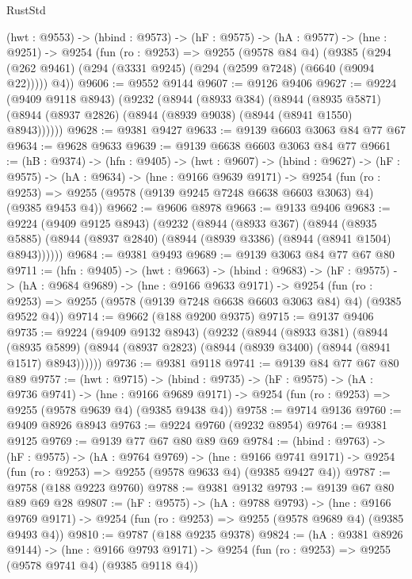 \begin{lexlean}{RustStd}
\begin{coremodule}
  (hwt : @9553) ->
  (hbind : @9573) ->
  (hF : @9575) ->
  (hA : @9577) ->
  (hne : @9251) ->
  @9254
    (fun (ro : @9253) =>
    @9255
      (@9578 @84 @4)
      (@9385 (@294 (@262 @9461) (@294 (@3331 @9245) (@294 (@2599 @7248) (@6640 (@9094 @22))))) @4))
@9606 := @9552 @9144
@9607 := @9126 @9406
@9627 := @9224
    (@9409 @9118 @8943)
    (@9232
      (@8944
        (@8933 @384)
        (@8944
          (@8935 @5871)
          (@8944 (@8937 @2826) (@8944 (@8939 @9038) (@8944 (@8941 @1550) @8943))))))
@9628 := @9381 @9427
@9633 := @9139 @6603 @3063 @84 @77 @67
@9634 := @9628 @9633
@9639 := @9139 @6638 @6603 @3063 @84 @77
@9661 := (hB : @9374) ->
  (hfn : @9405) ->
  (hwt : @9607) ->
  (hbind : @9627) ->
  (hF : @9575) ->
  (hA : @9634) ->
  (hne : @9166 @9639 @9171) ->
  @9254
    (fun (ro : @9253) => @9255 (@9578 (@9139 @9245 @7248 @6638 @6603 @3063) @4) (@9385 @9453 @4))
@9662 := @9606 @8978
@9663 := @9133 @9406
@9683 := @9224
    (@9409 @9125 @8943)
    (@9232
      (@8944
        (@8933 @367)
        (@8944
          (@8935 @5885)
          (@8944 (@8937 @2840) (@8944 (@8939 @3386) (@8944 (@8941 @1504) @8943))))))
@9684 := @9381 @9493
@9689 := @9139 @3063 @84 @77 @67 @80
@9711 := (hfn : @9405) ->
  (hwt : @9663) ->
  (hbind : @9683) ->
  (hF : @9575) ->
  (hA : @9684 @9689) ->
  (hne : @9166 @9633 @9171) ->
  @9254 (fun (ro : @9253) => @9255 (@9578 (@9139 @7248 @6638 @6603 @3063 @84) @4) (@9385 @9522 @4))
@9714 := @9662 (@188 @9200 @9375)
@9715 := @9137 @9406
@9735 := @9224
    (@9409 @9132 @8943)
    (@9232
      (@8944
        (@8933 @381)
        (@8944
          (@8935 @5899)
          (@8944 (@8937 @2823) (@8944 (@8939 @3400) (@8944 (@8941 @1517) @8943))))))
@9736 := @9381 @9118
@9741 := @9139 @84 @77 @67 @80 @89
@9757 := (hwt : @9715) ->
  (hbind : @9735) ->
  (hF : @9575) ->
  (hA : @9736 @9741) ->
  (hne : @9166 @9689 @9171) -> @9254 (fun (ro : @9253) => @9255 (@9578 @9639 @4) (@9385 @9438 @4))
@9758 := @9714 @9136
@9760 := @9409 @8926 @8943
@9763 := @9224 @9760 (@9232 @8954)
@9764 := @9381 @9125
@9769 := @9139 @77 @67 @80 @89 @69
@9784 := (hbind : @9763) ->
  (hF : @9575) ->
  (hA : @9764 @9769) ->
  (hne : @9166 @9741 @9171) -> @9254 (fun (ro : @9253) => @9255 (@9578 @9633 @4) (@9385 @9427 @4))
@9787 := @9758 (@188 @9223 @9760)
@9788 := @9381 @9132
@9793 := @9139 @67 @80 @89 @69 @28
@9807 := (hF : @9575) ->
  (hA : @9788 @9793) ->
  (hne : @9166 @9769 @9171) -> @9254 (fun (ro : @9253) => @9255 (@9578 @9689 @4) (@9385 @9493 @4))
@9810 := @9787 (@188 @9235 @9378)
@9824 := (hA : @9381 @8926 @9144) ->
  (hne : @9166 @9793 @9171) -> @9254 (fun (ro : @9253) => @9255 (@9578 @9741 @4) (@9385 @9118 @4))

\end{coremodule}
\end{lexlean}
